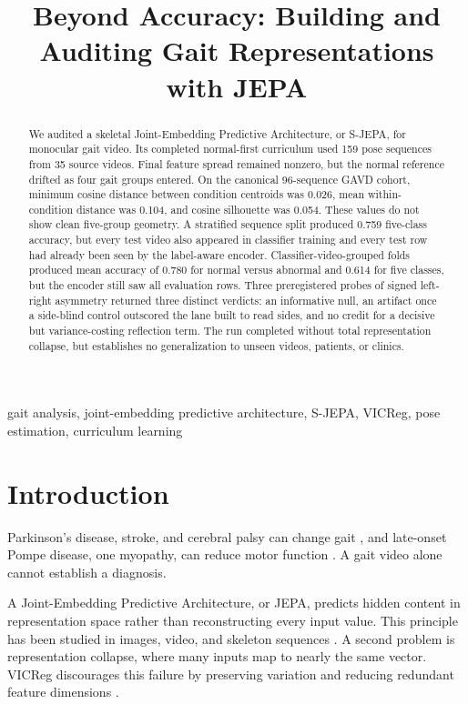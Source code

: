 \documentclass[conference]{IEEEtran}
\title{Beyond Accuracy: Building and Auditing Gait Representations with JEPA}
\author{
\IEEEauthorblockN{Theodore Mui, Alex Mui, and Phil Mui}
}
\begin{document}
\maketitle

\begin{abstract}
We audited a skeletal Joint-Embedding Predictive Architecture, or S-JEPA, for monocular gait video. Its completed normal-first curriculum used 159 pose sequences from 35 source videos. Final feature spread remained nonzero, but the normal reference drifted as four gait groups entered. On the canonical 96-sequence GAVD cohort, minimum cosine distance between condition centroids was 0.026, mean within-condition distance was 0.104, and cosine silhouette was 0.054. These values do not show clean five-group geometry. A stratified sequence split produced 0.759 five-class accuracy, but every test video also appeared in classifier training and every test row had already been seen by the label-aware encoder. Classifier-video-grouped folds produced mean accuracy of 0.780 for normal versus abnormal and 0.614 for five classes, but the encoder still saw all evaluation rows. Three preregistered probes of signed left-right asymmetry returned three distinct verdicts: an informative null, an artifact once a side-blind control outscored the lane built to read sides, and no credit for a decisive but variance-costing reflection term. The run completed without total representation collapse, but establishes no generalization to unseen videos, patients, or clinics.
\end{abstract}

\begin{IEEEkeywords}
gait analysis, joint-embedding predictive architecture, S-JEPA, VICReg, pose estimation, curriculum learning
\end{IEEEkeywords}

\section{Introduction}
Parkinson's disease, stroke, and cerebral palsy can change gait \cite{zanardi2021parkinsons,lauziere2014stroke,pandey2023crouch}, and late-onset Pompe disease, one myopathy, can reduce motor function \cite{maulet2023myopathy}. A gait video alone cannot establish a diagnosis.

A Joint-Embedding Predictive Architecture, or JEPA, predicts hidden content in representation space rather than reconstructing every input value. This principle has been studied in images, video, and skeleton sequences \cite{assran2023ijepa,bardes2024vjepa,abdelfattah2024sjepa}. A second problem is representation collapse, where many inputs map to nearly the same vector. VICReg discourages this failure by preserving variation and reducing redundant feature dimensions \cite{bardes2022vicreg}.
\end{document}
